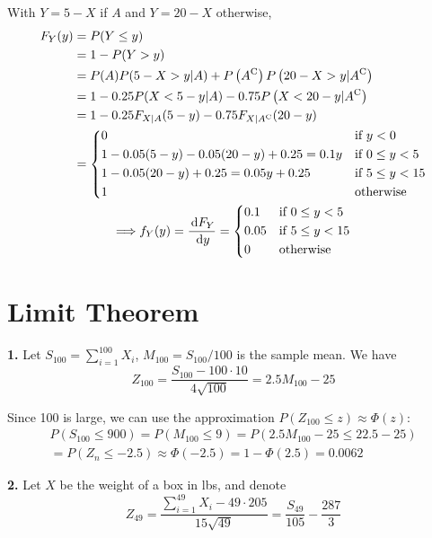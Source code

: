 \documentclass[a4paper,12pt]{article}
\newcommand{\C}{\mathrm C}
\newcommand{\ud}{\,\mathrm{d}}
\newcommand{\exercise}[1]{\noindent\textbf{#1.}}
\begin{document}
With $Y = 5 - X$ if $A$ and $Y = 20 - X$ otherwise,
\begin{multline*}
  \begin{aligned}
    F_Y(y) &= P(Y \le y)\\
    &= 1 - P(Y > y)\\
    &= P(A)P(5 - X > y|A) + P\left(A^\C\right)P\left(20 - X > y|A^\C\right)\\
    &= 1 - 0.25P(X < 5 - y|A) - 0.75P\left(X < 20 - y|A^\C\right)\\
    &= 1 - 0.25F_{X|A}(5 - y) - 0.75F_{X|A^\C}(20 - y)\\
    &= \begin{dcases}
      0 &\text{if }y < 0\\
      1 - 0.05(5 - y) - 0.05(20 - y) + 0.25 = 0.1y &\text{if }0 \le y < 5\\
      1 - 0.05(20 - y) + 0.25 = 0.05y + 0.25 &\text{if }5 \le y < 15\\
      1 &\text{otherwise}
    \end{dcases}
  \end{aligned}\\
  \Longrightarrow f_Y(y) = \frac{\ud F_Y}{\ud y} = \begin{dcases}
    0.1 &\text{if }0 \le y < 5\\
    0.05 &\text{if }5 \le y < 15\\
    0 &\text{otherwise}
  \end{dcases}
\end{multline*}
\pagebreak

\setcounter{section}{8}
\section{Limit Theorem}
\exercise 1  Let $S_{100} = \sum_{i=1}^{100}X_i$, $M_{100} = S_{100}/100$
is the sample mean.  We have
\[Z_{100} = \frac{S_{100} - 100\cdot 10}{4\sqrt{100}} = 2.5M_{100} - 25\]

Since 100 is large, we can use the approximation
$P(Z_{100} \le z) \approx \Phi(z)$:
\begin{multline*}
  P(S_{100} \le 900) = P(M_{100} \le 9) = P(2.5M_{100} - 25 \le 22.5 - 25)\\
  = P(Z_n \le -2.5) \approx \Phi(-2.5) = 1 - \Phi(2.5) = 0.0062
\end{multline*}

\exercise 2  Let $X$ be the weight of a box in lbs, and denote
\[Z_{49} = \frac{\sum_{i=1}^{49}X_i - 49\cdot 205}{15\sqrt{49}}
= \frac{S_{49}}{105} - \frac{287}{3}\]
\end{document}
